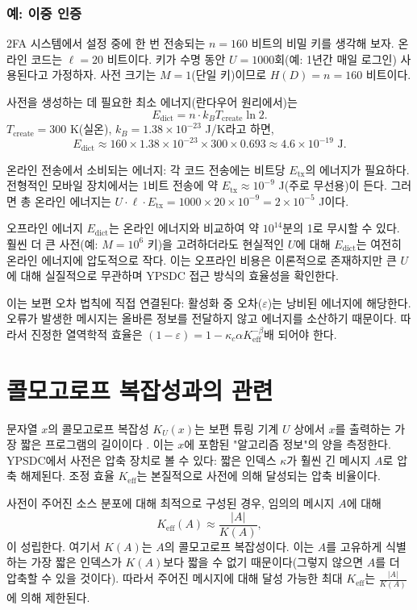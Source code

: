 \documentclass[12pt,a4paper]{article}
\newcommand{\Keff}{K_{\mathrm{eff}}}
\begin{document}
	\subsubsection{예: 이중 인증}
	2FA 시스템에서 설정 중에 한 번 전송되는 $n = 160$ 비트의 비밀 키를 생각해 보자. 온라인 코드는 $\ell = 20$ 비트이다. 키가 수명 동안 $U = 1000$회(예: 1년간 매일 로그인) 사용된다고 가정하자. 사전 크기는 $M = 1$(단일 키)이므로 $H(D) = n = 160$ 비트이다.
	
	사전을 생성하는 데 필요한 최소 에너지(란다우어 원리에서)는
	\[
	E_{\text{dict}} = n \cdot k_B T_{\text{create}} \ln 2.
	\]
	$T_{\text{create}} = 300$ K(실온), $k_B = 1.38 \times 10^{-23}$ J/K라고 하면,
	\[
	E_{\text{dict}} \approx 160 \times 1.38 \times 10^{-23} \times 300 \times 0.693 \approx 4.6 \times 10^{-19} \text{ J}.
	\]
	
	온라인 전송에서 소비되는 에너지: 각 코드 전송에는 비트당 $E_{\text{tx}}$의 에너지가 필요하다. 전형적인 모바일 장치에서는 1비트 전송에 약 $E_{\text{tx}} \approx 10^{-9}$ J(주로 무선용)이 든다. 그러면 총 온라인 에너지는 $U \cdot \ell \cdot E_{\text{tx}} = 1000 \times 20 \times 10^{-9} = 2 \times 10^{-5}$ J이다.
	
	오프라인 에너지 $E_{\text{dict}}$는 온라인 에너지와 비교하여 약 $10^{14}$분의 1로 무시할 수 있다. 훨씬 더 큰 사전(예: $M = 10^6$ 키)을 고려하더라도 현실적인 $U$에 대해 $E_{\text{dict}}$는 여전히 온라인 에너지에 압도적으로 작다. 이는 오프라인 비용은 이론적으로 존재하지만 큰 $U$에 대해 실질적으로 무관하며 YPSDC 접근 방식의 효율성을 확인한다.
	
	이는 보편 오차 법칙에 직접 연결된다: 활성화 중 오차($\varepsilon$)는 낭비된 에너지에 해당한다. 오류가 발생한 메시지는 올바른 정보를 전달하지 않고 에너지를 소산하기 때문이다. 따라서 진정한 열역학적 효율은 $(1-\varepsilon) = 1 - \kappa_c\alpha K_{\mathrm{eff}}^{-\beta}$배 되어야 한다.
	
	\section{콜모고로프 복잡성과의 관련}
	\label{sec:kolmogorov}
	
	문자열 $x$의 콜모고로프 복잡성 $K_U(x)$는 보편 튜링 기계 $U$ 상에서 $x$를 출력하는 가장 짧은 프로그램의 길이이다 \cite{Kolmogorov1965}. 이는 $x$에 포함된 "알고리즘 정보"의 양을 측정한다. YPSDC에서 사전은 압축 장치로 볼 수 있다: 짧은 인덱스 $\kappa$가 훨씬 긴 메시지 $A$로 압축 해제된다. 조정 효율 $\Keff$는 본질적으로 사전에 의해 달성되는 압축 비율이다.
	
	사전이 주어진 소스 분포에 대해 최적으로 구성된 경우, 임의의 메시지 $A$에 대해
	\begin{equation}
		\Keff(A) \approx \frac{|A|}{K(A)}, \label{eq:kolmogorov}
	\end{equation}
	이 성립한다. 여기서 $K(A)$는 $A$의 콜모고로프 복잡성이다. 이는 $A$를 고유하게 식별하는 가장 짧은 인덱스가 $K(A)$보다 짧을 수 없기 때문이다(그렇지 않으면 $A$를 더 압축할 수 있을 것이다). 따라서 주어진 메시지에 대해 달성 가능한 최대 $\Keff$는 $\frac{|A|}{K(A)}$에 의해 제한된다.
	
\end{document}
